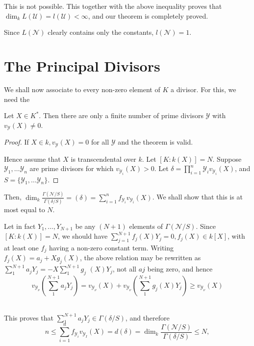 This is not possible. This together with the above inequality proves
that $\dim_k L (\mathscr{U}) = l(\mathscr{U}) < \infty$, and our
theorem is completely proved. 

Since $L (\mathscr{N})$ clearly contains only the constants, $l
(\mathscr{N}) = 1$. 

\section{The Principal Divisors}\label{chap6:sce11}

We shall now associate to every non-zero element of $K$ a divisor. For
this, we need the  
\begin{theorem*}
  Let $X \in K^*$. Then there are only a finite number of prime
  divisors $\mathscr{Y}$ with $v_{\mathscr{Y}}(X) \neq 0$.  
\end{theorem*}

\begin{proof}
  If $X \in k, v_{\mathscr{Y}}(X) =0$ for all $\mathscr{Y}$ and the
  theorem is valid. 

  Hence assume that $X$ is transcendental over $k$. Let $[K:
    k(X)]=N$. Suppose $\mathscr{Y}_1, \ldots \mathscr{Y}_n$ are prime
  divisors for which $v_{\mathscr{Y}_i}(X) > 0$. Let $\delta = \prod
  \limits^n_{i=1} \mathscr{Y}_i v_{\mathscr{Y}_i}(X)$, and $S= \{
  \mathscr{Y}_1, \ldots \mathscr{Y}_n\}$. 
\end{proof}

Then, $\dim_k \frac{\Gamma(\mathscr{N}/S)}{\Gamma(\delta /S)} =
(\delta) = \sum \limits^n_{i =1} f_{\mathscr{Y}_i}
v_{\mathscr{Y}_i}(X)$. We shall show that this is at most equal to
$N$. 

Let in fact $Y_1, \ldots ,Y_{N+1}$ be any $(N+1)$ elements of $\Gamma
(\mathscr{N}/S)$. Since $[K: k(X)] =N$, we should have $\sum
\limits^{N+1}_{j =1} f_j (X) Y_j = 0, f_j (X) \in k [X]$, with at
least one $f_j$ having a non-zero constant term. Writing $f_j(X) =a_j
+ Xg_j (X)$, the above  relation may be rewritten as $\sum
\limits^{N+1}_1 a_j Y_j = -X \sum \limits^{N+1}_1 g_j$ $(X) Y_j$, not
all $aj$ being zero, and hence 
$$
v_{\mathscr{Y}_\nu} \left(\sum^{N+1}_{1} a_j Y_j\right) = v_{\mathscr{Y}_\nu} (X)
+ v_{\mathscr{Y}_\nu} \left(\sum^{N+1}_1 g_j (X) Y_j\right) \ge
v_{\mathscr{Y}_\nu} (X) 
$$\pageoriginale\

This proves that $\sum\limits _{1}^{N+1} a_j Y_j \in \Gamma
(\delta/S)$, and therefore 
$$
n \le \sum^n_{i=1} f_{\mathscr{Y}_i} v_{\mathscr{Y}_I} (X) = d
(\delta) = \dim_k \frac{\Gamma (\mathscr{N}/S)} {\Gamma(\delta/S)} \le
N , 
$$


